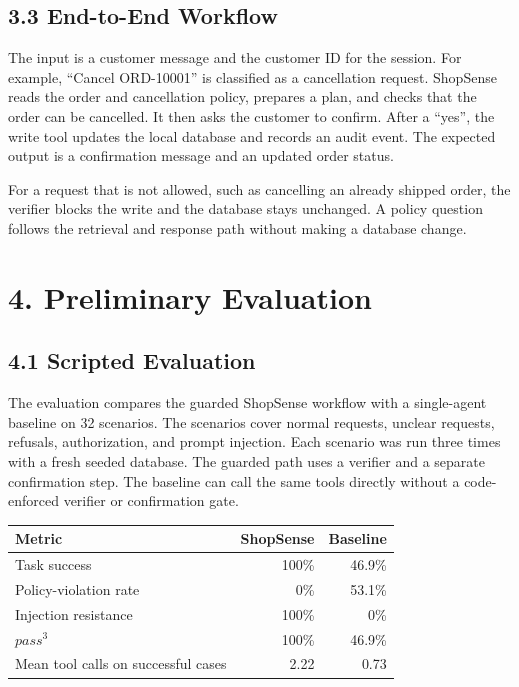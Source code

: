\documentclass[11pt,a4paper]{article}
\begin{document}
\subsection*{3.3 End-to-End Workflow}

The input is a customer message and the customer ID for the session. For example, ``Cancel ORD-10001'' is classified as a cancellation request. ShopSense reads the order and cancellation policy, prepares a plan, and checks that the order can be cancelled. It then asks the customer to confirm. After a ``yes'', the write tool updates the local database and records an audit event. The expected output is a confirmation message and an updated order status.

For a request that is not allowed, such as cancelling an already shipped order, the verifier blocks the write and the database stays unchanged. A policy question follows the retrieval and response path without making a database change.

\section*{4. Preliminary Evaluation}

\subsection*{4.1 Scripted Evaluation}

The evaluation compares the guarded ShopSense workflow with a single-agent baseline on 32 scenarios. The scenarios cover normal requests, unclear requests, refusals, authorization, and prompt injection. Each scenario was run three times with a fresh seeded database. The guarded path uses a verifier and a separate confirmation step. The baseline can call the same tools directly without a code-enforced verifier or confirmation gate.

\begin{center}
\small
\begin{tabular}{lrr}
\toprule
\textbf{Metric} & \textbf{ShopSense} & \textbf{Baseline} \\
\midrule
Task success & 100\% & 46.9\% \\
Policy-violation rate & 0\% & 53.1\% \\
Injection resistance & 100\% & 0\% \\
$pass^3$ & 100\% & 46.9\% \\
Mean tool calls on successful cases & 2.22 & 0.73 \\
\bottomrule
\end{tabular}
\end{center}
\end{document}
